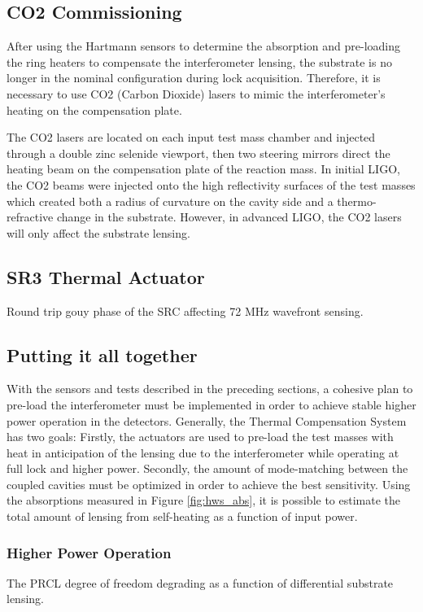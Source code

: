 	\subsection{CO2 Commissioning}\label{Sec:CO2}
	After using the Hartmann sensors to determine the absorption and pre-loading the ring heaters to compensate the interferometer lensing, the substrate is no longer in the nominal configuration during lock acquisition.  Therefore, it is necessary to use CO2 (Carbon Dioxide) lasers to mimic the interferometer's heating on the compensation plate.
	
	The CO2 lasers are located on each input test mass chamber and injected through a double zinc selenide viewport, then two steering mirrors direct the heating beam on the compensation plate of the reaction mass.  In initial LIGO, the CO2 beams were injected onto the high reflectivity surfaces of the test masses which created both a radius of curvature on the cavity side and a thermo-refractive change in the substrate.  However, in advanced LIGO, the CO2 lasers will only affect the substrate lensing.	
	
	\subsection{SR3 Thermal Actuator}
	Round trip gouy phase of the SRC affecting 72 MHz wavefront sensing.
	
	\subsection{Putting it all together}
	With the sensors and tests described in the preceding sections, a cohesive plan to pre-load the interferometer must be implemented in order to achieve stable higher power operation in the detectors.  Generally, the Thermal Compensation System has two goals: Firstly, the actuators are used to pre-load the test masses with heat in anticipation of the lensing due to the interferometer while operating at full lock and higher power.  Secondly, the amount of mode-matching between the coupled cavities must be optimized in order to achieve the best sensitivity.  Using the absorptions measured in Figure \ref{fig:hws_abs}, it is possible to estimate the total amount of lensing from self-heating as a function of input power.
	
		\subsubsection{Higher Power Operation}
		The PRCL degree of freedom degrading as a function of differential substrate lensing.
	
